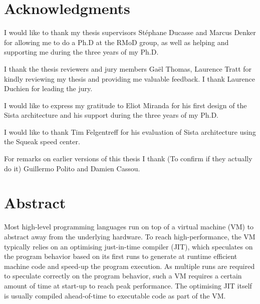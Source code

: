 \documentclass[a4paper,12pt,twoside]{includes/ThesisStyle}
\begin{document}

\dominitoc


\cleardoublepage

\section*{Acknowledgments}

I would like to thank my thesis supervisors St\'ephane Ducasse and Marcus Denker for allowing me to do a Ph.D at the RMoD group, as well as helping and supporting me during the three years of my Ph.D.

I thank the thesis reviewers and jury members Ga\"el Thomas, Laurence Tratt for kindly reviewing my thesis and providing me valuable feedback. I thank Laurence Duchien for leading the jury.

I would like to express my gratitude to Eliot Miranda for his first design of the Sista architecture and his support during the three years of my Ph.D. 

I would like to thank Tim Felgentreff for his evaluation of Sista architecture using the Squeak speed center.

For remarks on earlier versions of this thesis I thank (To confirm if they actually do it) Guillermo Polito and Damien Cassou.

\cleardoublepage

\section*{Abstract}

Most high-level programming languages run on top of a virtual machine (VM) to abstract away from the underlying hardware. To reach high-performance, the VM typically relies on an optimising just-in-time compiler (JIT), which speculates on the program behavior based on its first runs to generate at runtime efficient machine code and speed-up the program execution. As multiple runs are required to speculate correctly on the program behavior, such a VM requires a certain amount of time at start-up to reach peak performance. The optimising JIT itself is usually compiled ahead-of-time to executable code as part of the VM.
\end{document}
